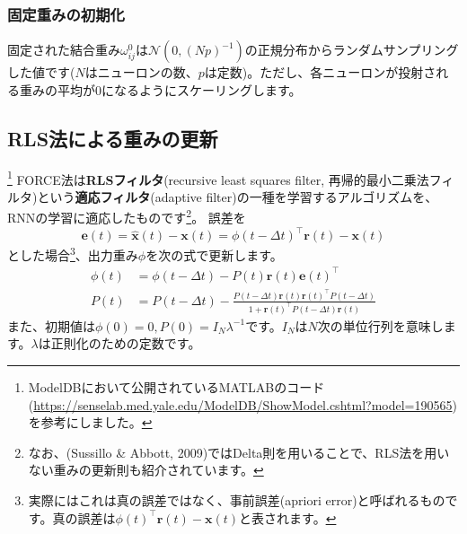 \subsubsection{固定重みの初期化}
固定された結合重み$\omega_{i j}^{0}$は$\mathcal{N}(0, (Np)^{-1})$の正規分布からランダムサンプリングした値です($N$はニューロンの数、$p$は定数)。ただし、各ニューロンが投射される重みの平均が0になるようにスケーリングします。
\subsection{RLS法による重みの更新}
\footnote{ModelDBにおいて公開されているMATLABのコード(\url{https://senselab.med.yale.edu/ModelDB/ShowModel.cshtml?model=190565})を参考にしました。}
FORCE法は\textbf{RLSフィルタ}(recursive least squares filter, 再帰的最小二乗法フィルタ)という\textbf{適応フィルタ}(adaptive filter)の一種を学習するアルゴリズムを、RNNの学習に適応したものです\footnote{なお、(Sussillo \& Abbott, 2009)ではDelta則を用いることで、RLS法を用いない重みの更新則も紹介されています。}。
誤差を 
\begin{equation}
\boldsymbol{e}(t)=\hat{\boldsymbol{x}}(t)-\boldsymbol{x}(t)=\phi(t-\Delta t)^\intercal \boldsymbol{r}(t)-\boldsymbol{x}(t)    
\end{equation}
とした場合\footnote{実際にはこれは真の誤差ではなく、事前誤差(apriori error)と呼ばれるものです。真の誤差は$\phi(t)^\intercal \boldsymbol{r}(t)-\boldsymbol{x}(t)$と表されます。}、出力重み$\phi$を次の式で更新します。
\begin{align}
\phi(t)&=\phi(t-\Delta t)-P(t) \boldsymbol{r}(t)\boldsymbol{e}(t)^\intercal\\
P(t)&=P(t-\Delta t)-\frac{P(t-\Delta t) \boldsymbol{r}(t) \boldsymbol{r}(t)^\intercal P(t-\Delta t)}{1+\boldsymbol{r}(t)^\intercal P(t-\Delta
t) \boldsymbol{r}(t)} 
\end{align}
また、初期値は$\phi(0)=0,
P(0)=I_{N}\lambda^{-1}$です。$I_{N}$は$N$次の単位行列を意味します。$\lambda$は正則化のための定数です。
